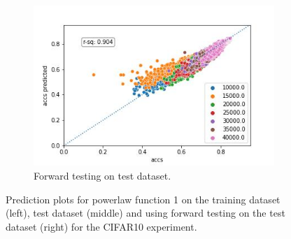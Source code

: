 \documentclass{article} %
\begin{document}
\begin{figure}
\begin{subfigure}{.33\textwidth}
    \end{subfigure}
    \begin{subfigure}{.33\textwidth}
        \centering
        \includegraphics[width=.8\linewidth]{cifar10/powerlaw_all_epochs_accs_hat_classes_arctan_epoch_artan_val_forward_testing.jpg}
        \caption{Forward testing on test dataset.}
        \label{fig:powerlaw_acc_classes_arctan_epoch_artan_forward_val}
    \end{subfigure}
    \caption{Prediction plots for powerlaw function 1 on the training dataset (left), test dataset (middle) and using forward testing on the test dataset (right) for the CIFAR10 experiment.}
    \label{fig:powerlaw_prediction_plot_fct_1}
\end{figure}
\end{document}
